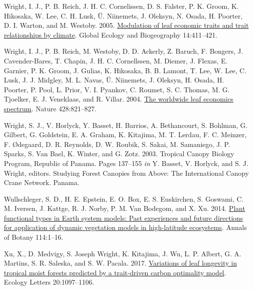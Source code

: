 \documentclass[
  12pt,
  a4paper,
,tablecaptionabove
]{scrartcl}
\newlength{\cslhangindent}
\newenvironment{CSLReferences}[2] %
 {%
  \setlength{\parindent}{0pt}
  \ifodd #1 \everypar{\setlength{\hangindent}{\cslhangindent}}\ignorespaces\fi
  \ifnum #2 > 0
  \setlength{\parskip}{#2\baselineskip}
  \fi
 }%
 {}
\begin{document}
\begin{CSLReferences}{1}{0}
\leavevmode{}%
Wright, I. J., P. B. Reich, J. H. C. Cornelissen, D. S. Falster, P. K.
Groom, K. Hikosaka, W. Lee, C. H. Lusk, Ü. Niinemets, J. Oleksyn, N.
Osada, H. Poorter, D. I. Warton, and M. Westoby. 2005.
\href{https://doi.org/10.1111/j.1466-822x.2005.00172.x}{Modulation of
leaf economic traits and trait relationships by climate}. Global Ecology
and Biogeography 14:411--421.

\leavevmode{}%
Wright, I. J., P. B. Reich, M. Westoby, D. D. Ackerly, Z. Baruch, F.
Bongers, J. Cavender-Bares, T. Chapin, J. H. C. Cornellssen, M. Diemer,
J. Flexas, E. Garnier, P. K. Groom, J. Gulias, K. Hikosaka, B. B.
Lamont, T. Lee, W. Lee, C. Lusk, J. J. Midgley, M. L. Navas, Ü.
Niinemets, J. Oleksyn, H. Osada, H. Poorter, P. Pool, L. Prior, V. I.
Pyankov, C. Roumet, S. C. Thomas, M. G. Tjoelker, E. J. Veneklaas, and
R. Villar. 2004. \href{https://doi.org/10.1038/nature02403}{The
worldwide leaf economics spectrum}. Nature 428:821--827.

\leavevmode{}%
Wright, S. J., V. Horlyck, Y. Basset, H. Barrios, A. Bethancourt, S.
Bohlman, G. Gilbert, G. Goldstein, E. A. Graham, K. Kitajima, M. T.
Lerdau, F. C. Meinzer, F. Ødegaard, D. R. Reynolds, D. W. Roubik, S.
Sakai, M. Samaniego, J. P. Sparks, S. Van Bael, K. Winter, and G. Zotz.
2003. Tropical {Canopy Biology Program}, {Republic} of {Panama}. Pages
137--155 \emph{in} Y. Basset, V. Horlyck, and S. J. Wright, editors.
Studying {Forest Canopies} from {Above}: {The International Canopy Crane
Network}. {Panama}.

\leavevmode{}%
Wullschleger, S. D., H. E. Epstein, E. O. Box, E. S. Euskirchen, S.
Goswami, C. M. Iversen, J. Kattge, R. J. Norby, P. M. Van Bodegom, and
X. Xu. 2014. \href{https://doi.org/10.1093/aob/mcu077}{Plant functional
types in {Earth} system models: {Past} experiences and future directions
for application of dynamic vegetation models in high-latitude
ecosystems}. Annals of Botany 114:1--16.

\leavevmode{}%
Xu, X., D. Medvigy, S. Joseph Wright, K. Kitajima, J. Wu, L. P. Albert,
G. A. Martins, S. R. Saleska, and S. W. Pacala. 2017.
\href{https://doi.org/10.1111/ele.12804}{Variations of leaf longevity in
tropical moist forests predicted by a trait-driven carbon optimality
model}. Ecology Letters 20:1097--1106.

\end{CSLReferences}
\end{document}

